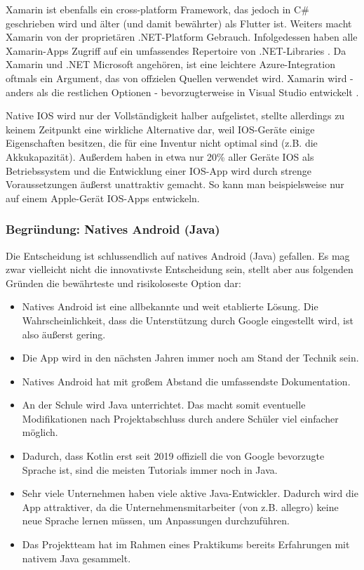 Xamarin ist ebenfalls ein cross-platform Framework, das jedoch in C\#
geschrieben wird und älter (und damit bewährter) als Flutter ist.
Weiters macht Xamarin von der proprietären .NET-Platform Gebrauch.
Infolgedessen haben alle Xamarin-Apps Zugriff auf ein umfassendes
Repertoire von .NET-Libraries \cite{xamarin-details}. Da Xamarin und
.NET Microsoft angehören, ist eine leichtere Azure-Integration oftmals
ein Argument, das von offzielen Quellen verwendet wird. Xamarin wird -
anders als die restlichen Optionen - bevorzugterweise in Visual Studio
entwickelt \cite{xamarin-vs}.

Native IOS wird nur der Vollständigkeit halber aufgelistet, stellte
allerdings zu keinem Zeitpunkt eine wirkliche Alternative dar, weil
IOS-Geräte einige Eigenschaften besitzen, die für eine Inventur nicht
optimal sind (z.B. die Akkukapazität). Außerdem haben in etwa nur 20\%
aller Geräte \cite{ios-market-share} IOS als Betriebssystem und die
Entwicklung einer IOS-App wird durch strenge Voraussetzungen äußerst
unattraktiv gemacht. So kann man beispielsweise nur auf einem
Apple-Gerät IOS-Apps entwickeln.

\hypertarget{begruxfcndung-natives-android-java}{%
\subsubsection{Begründung: Natives Android
(Java)}\label{begruxfcndung-natives-android-java}}

Die Entscheidung ist schlussendlich auf natives Android (Java) gefallen.
Es mag zwar vielleicht nicht die innovativste Entscheidung sein, stellt
aber aus folgenden Gründen die bewährteste und risikoloseste Option dar:

\begin{itemize}
\tightlist
\item
  Natives Android ist eine allbekannte und weit etablierte Lösung. Die
  Wahrscheinlichkeit, dass die Unterstützung durch Google eingestellt
  wird, ist also äußerst gering.
\item
  Die App wird in den nächsten Jahren immer noch am Stand der Technik
  sein.
\item
  Natives Android hat mit großem Abstand die umfassendste Dokumentation.
\item
  An der Schule wird Java unterrichtet. Das macht somit eventuelle
  Modifikationen nach Projektabschluss durch andere Schüler viel
  einfacher möglich.
\item
  Dadurch, dass Kotlin erst seit 2019 \cite{kotlin-preference} offiziell
  die von Google bevorzugte Sprache ist, sind die meisten Tutorials
  immer noch in Java.
\item
  Sehr viele Unternehmen haben viele aktive Java-Entwickler. Dadurch
  wird die App attraktiver, da die Unternehmensmitarbeiter (von z.B.
  allegro) keine neue Sprache lernen müssen, um Anpassungen
  durchzuführen.
\item
  Das Projektteam hat im Rahmen eines Praktikums bereits Erfahrungen mit
  nativem Java gesammelt.
\end{itemize}

